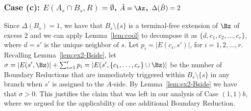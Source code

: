 \begin{comment}
Consider now terminal separation $(A,B_{tt'\to B})$. From its definition it follows that it is indeed a terminal separation, it extends $(A_{tt'\to B},B_{tt'\to B})$, and it has no larger cost because $d(A)\leq d(A_{tt'\to B})$. However, due to $s'\in A_s$ we see that $(A,B_{tt'\to B})$ assigns at least one more nonterminal to one of the sides than $(A_{tt'\to B},B_{tt'\to B})$. This is a contradiction with the maximality of $(A_{tt'\to B},B_{tt'\to B})$.
\end{proof}

From Lemma~\ref{lem:sp-colored} we infer that in both of the branches, the Boundary Reduction will be applied at least $p$ times: either $p$ times on $a$ (provided $s'$ is assigned to the $B$-side), or $q$ times on $b$ and $q'$ times on edges between $s'$ and $\Bz$ (provided $s'$ is assigned to the $A$-side). 

We now calculate the branching vectors when branching on $\{s,t\}$ with $ss'$ fixed. By Lemma~\ref{lem:lb}, we have that $\Delta(B_{tt'\to A})\geq 1$ and $\Delta(A_{tt'\to B})\geq 1$, and $p$ Boundary Reductions are triggered on the side of $s$. 

Suppose first that $t$ is an antenna, then by the definition of the antenna we have that $\Delta(A_{tt'\to A})\geq 2$ or $\Delta(B_{tt'\to B})\geq 2$, depending whether $\Bz$ or $\Az$ is the natural side of $t$. Moreover, one Boundary Reduction is triggered on $t'$, and by $t'\notin A_s\cup B_s$ we know that this Boundary Reduction was not accounted for in the previous calculations. Hence, we obtain branching vector $[1,1,p;1,3,p+1]$, or $[1,3,p+1;1,1,p]$, or better, depending on the natural side of $t$. Since $p\geq 1$, these branching vectors are good.

Suppose now that $t$ is of type $(1,1)$, and moreover that investigation of its situation also leads to the same case (b). Then we have that $\Delta(A_{tt'\to A})\geq 1$ and $\Delta(A_{tt'\to A})\geq 1$ by Lemma~\ref{lem:lb}, and at least one Boundary Reduction is applied in both of the branches on 
\end{comment}

\subsubsection{Case (c): $E(A_s \cap B_s, R) = \emptyset$, $\Atr=\Az$, $\Delta(\tilde{B})=2$}



Since $\Delta(B_s)=1$, we have that $B_s\setminus \{s\}$ is a terminal-free extension of $\Bz$ of excess $2$ and we can apply Lemma~\ref{lem:cool} to decompose it as $\{d,c_1,c_2,\ldots,c_r\}$, where $d=s'$ is the unique neighbor of $s$. Let $p_i=|E(c_i,s')|$, for $i=1,2,\ldots,r$. Recalling Lemma~\ref{lem:ex2-Bside}, let $\sigma=|E(s',\Bz)|+\sum_{i=1}^r p_i=|E(s',\{c_1,\ldots,c_r\}\cup \Bz)|$ be the number of Boundary Reductions that are immediately triggered within $B_s\setminus \{s\}$ in any branch when $s'$ is assigned to the $A$-side. By Lemma~\ref{lem:ex2-Bside} we have that $\sigma>0$. This justifies the claim that was left in our analysis of Case $(1,1)b$, where we argued for the applicability of one additional Boundary Reduction.

